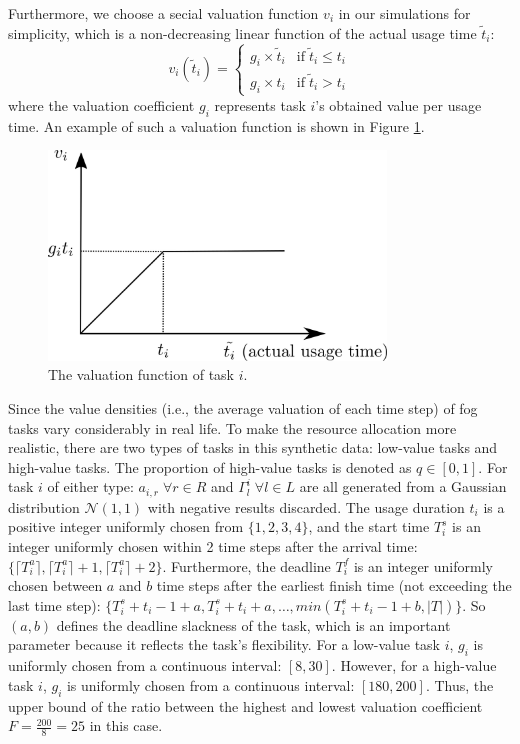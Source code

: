 \documentclass[11pt]{phdthesis}
\begin{document}
Furthermore, we choose a secial valuation function $ v_i $ in our simulations for simplicity, which is a non-decreasing linear function of the actual usage time $ \tilde{t}_i $:
\[ v_i(\tilde{t}_i) =
\begin{cases}
g_i \times \tilde{t}_i & \text{if} \; \tilde{t}_i \leq t_i  \\
g_i \times t_i  &    \text{if} \; \tilde{t}_i > t_i
\end{cases} 
\]
where the valuation coefficient $g_i$ represents task $ i $'s obtained value per usage time. 
An example of such a valuation function is shown in Figure \ref{fig:function}. 
\begin{figure}
    \centering
    \includegraphics[width=0.8\textwidth]{./Figures/valuation_function.png}
    \caption{\label{fig:function} The valuation function of task $i$.}
\end{figure}

Since the value densities (i.e., the average valuation of each time step) of fog tasks vary considerably in real life. To make the resource allocation more realistic, there are two types of tasks in this synthetic data: low-value tasks and high-value tasks. The proportion of high-value tasks is denoted as $ q \in [0, 1] $. For task $ i $ of either type: $a_{i,r} \; \forall r \in R$ and $\Gamma_l^i \; \forall l \in L$ are all generated from a Gaussian distribution $\mathcal{N} (1, 1)$ with negative results discarded. The usage duration $t_i$ is a positive integer uniformly chosen from $\{ 1,2,3,4 \} $, and the start time $T_i^s$ is an integer uniformly chosen within 2 time steps after the arrival time: $\{ \lceil{T_i^a}\rceil, \lceil{T_i^a}\rceil + 1, \lceil T_i^a \rceil +2 \} $. Furthermore, the deadline $T_i^f$ is an integer uniformly chosen between $ a $ and $ b $ time steps after the earliest finish time (not exceeding the last time step): $\{ T_i^s+t_i-1+a,T_i^s+t_i+a,\ldots, min(T_i^s+t_i-1+b, |T|) \} $. So $ (a, b)$ defines the deadline slackness of the task, which is an important parameter because it reflects the task's flexibility. For a low-value task $ i $, $g_i$ is uniformly chosen from a continuous interval: $[8,30]$. However, for a high-value task $ i $,  $g_i$ is uniformly chosen from a continuous interval: $[180,200]$. Thus, the upper bound of the ratio between the highest and lowest valuation coefficient $F = \frac{200}{8} = 25 $ in this case. 
\end{document}
